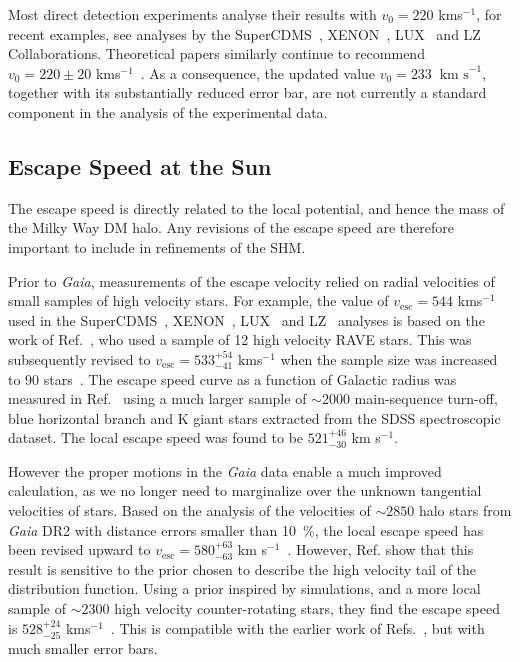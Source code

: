 \documentclass[prd,10pt,twocolumn,showpacs,nofootinbib, aps,superscriptaddress,preprintnumbers]{revtex4-1}
\newcommand{\vesc}{v_\mathrm{esc}}
\newcommand{\kms}{\textrm{ km s}^{-1}}
\begin{document}
Most direct detection experiments analyse their results 
with $v_0 = 220$ kms$^{-1}$, for recent examples, see analyses by the
SuperCDMS~\cite{Agnese:2014aze}, XENON~\citep{Aprile:2018dbl},
LUX~\citep{Ak17} and LZ~\citep{Akerib:2018lyp} Collaborations.
  Theoretical papers similarly continue to recommend $v_0 = 220
\pm 20$ kms$^{-1}$~\citep{Str13,Green:2017odb,Krauss18}. As a
consequence, the updated value $v_0 = 233~\kms$, together with its
substantially reduced error bar, are not currently a standard component in the
analysis of the experimental data.

\subsection{Escape Speed at the Sun}\label{sec:vesc}
The escape speed is directly related to the local potential, and
hence the mass of the Milky Way DM halo. Any revisions of the
escape speed are therefore important to include in refinements of the
SHM. 

Prior to \emph{Gaia}, measurements of the escape velocity relied on
radial velocities of small samples of high velocity stars.  For
example, the value of $\vesc = 544$ kms$^{-1}$ used in the
SuperCDMS~\cite{Agnese:2014aze}, XENON~\citep{Aprile:2018dbl},
LUX~\citep{Ak17} and LZ~\citep{Akerib:2018lyp} analyses is based on
the work of Ref.~\citep{Sm09}, who used a sample of 12 high velocity
RAVE stars. This was subsequently revised to $\vesc = 533^{+54}_{-41}$
kms$^{-1}$ when the sample size was increased to 90 stars~\cite{Pi14}. 
The escape speed curve as a function of Galactic
radius was measured in Ref.~\citep{Williams:2017} using a much larger
sample of $\sim 2000$ main-sequence turn-off, blue horizontal branch
and K giant stars extracted from the SDSS spectroscopic dataset.  The
local escape speed was found to be $521^{+46}_{-30}$ km s$^{-1}$.

However the proper motions in the \emph{Gaia} data enable a much
improved calculation, as we no longer need to marginalize over the
unknown tangential velocities of stars. Based on the analysis of the
velocities of $\sim 2850$ halo stars from \emph{Gaia} DR2 with
distance errors smaller than 10~\!\%, the local escape speed has been
revised upward to $\vesc = 580^{+63}_{-63}$ km s$^{-1}$~\citep{Mo18}.
However, Ref. \citep{Deason19} show that this result is sensitive to
the prior chosen to describe the high velocity tail of the
distribution function. Using a prior inspired by simulations, and a
more local sample of $\sim 2300$ high velocity counter-rotating stars,
they find the escape speed is $528_{-25}^{+24}$
kms$^{-1}$~\citep{Deason19}. This is compatible with the earlier work
of Refs.~\citep{Sm09,Williams:2017}, but with much smaller error bars.
\end{document}
